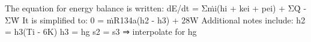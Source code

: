 The equation for energy balance is written:  
dE/dt = Σṁi(hi + kei + pei) + ΣQ̇ - ΣẆ  
It is simplified to:  
0 = ṁR134a(h2 - h3) + 28W  
Additional notes include:  
h2 = h3(Ti - 6K)  
h3 = hg  
s2 = s3 ⇒ interpolate for hg